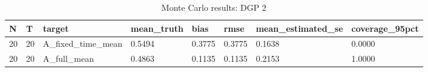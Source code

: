 \begin{table}[!htbp]
\centering
\caption{Monte Carlo results: DGP 2}
\label{tab:mc-dgp2}
\begin{tabular}{llllllll}
\toprule
N & T & target & mean\_truth & bias & rmse & mean\_estimated\_se & coverage\_95pct \\
\midrule
20 & 20 & A\_fixed\_time\_mean & 0.5494 & 0.3775 & 0.3775 & 0.1638 & 0.0000 \\
20 & 20 & A\_full\_mean & 0.4863 & 0.1135 & 0.1135 & 0.2153 & 1.0000 \\
\bottomrule
\end{tabular}
\end{table}
